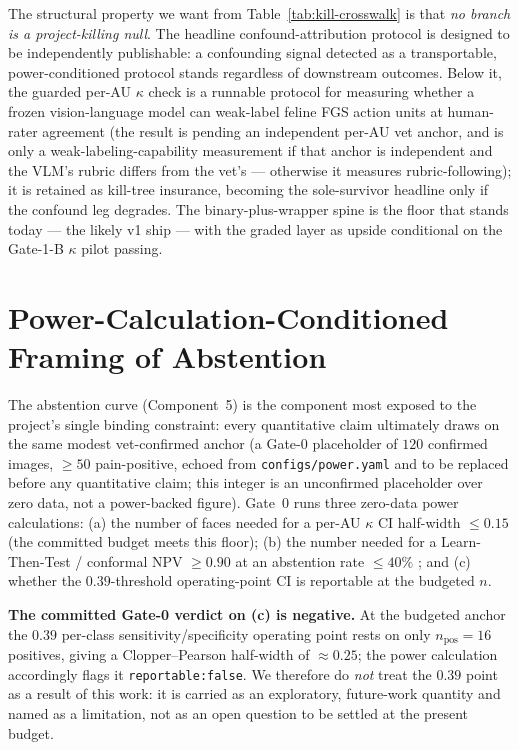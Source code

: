 The structural property we want from Table~\ref{tab:kill-crosswalk} is that
\emph{no branch is a project-killing null}. The headline confound-attribution
protocol is designed to be independently publishable: a confounding signal detected
as a transportable, power-conditioned protocol stands regardless of downstream
outcomes. Below it, the guarded per-AU $\kappa$ check is a runnable protocol for
measuring whether a frozen vision-language model can weak-label feline FGS action
units at human-rater agreement (the result is pending an independent per-AU vet
anchor, and is only a weak-labeling-capability measurement if that anchor is
independent and the VLM's rubric differs from the vet's --- otherwise it measures
rubric-following); it is retained as kill-tree insurance, becoming the
sole-survivor headline only if the confound leg degrades. The binary-plus-wrapper
spine is the floor that stands today --- the likely v1 ship --- with the graded
layer as upside conditional on the Gate-1-B $\kappa$ pilot passing.

\section{Power-Calculation-Conditioned Framing of Abstention}
\label{sec:power-conditioned}

The abstention curve (Component~5) is the component most exposed to the project's
single binding constraint: every quantitative claim ultimately draws on the same
modest vet-confirmed anchor (a Gate-0 placeholder of $120$ confirmed images,
$\geq 50$ pain-positive, echoed from \texttt{configs/power.yaml} and to be replaced
before any quantitative claim; this integer is an unconfirmed placeholder over
zero data, not a power-backed figure). Gate~0 runs three zero-data power
calculations: (a) the number of faces needed for a per-AU $\kappa$ CI half-width
$\leq 0.15$ (the committed budget meets this floor); (b) the number needed for a
Learn-Then-Test / conformal NPV $\geq 0.90$ at an abstention rate $\leq 40\%$
\citep{angelopoulos2021ltt}; and (c) whether the $0.39$-threshold operating-point
CI is reportable at the budgeted $n$.

\textbf{The committed Gate-0 verdict on (c) is negative.} At the budgeted anchor the
$0.39$ per-class sensitivity/specificity operating point rests on only $n_{\text{pos}}
= 16$ positives, giving a Clopper--Pearson half-width of $\approx 0.25$; the power
calculation accordingly flags it \texttt{reportable:false}. We therefore do
\emph{not} treat the $0.39$ point as a result of this work: it is carried as an
exploratory, future-work quantity and named as a limitation, not as an open question
to be settled at the present budget.

